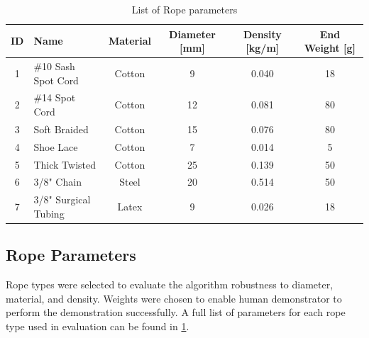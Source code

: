 \documentclass[conference]{IEEEtran}
\begin{document}
\begin{table}[t]
    \centering
    \caption{List of Rope parameters}
    \label{tab:rope_id}
    \small
    \setlength{\tabcolsep}{6pt}
    \begin{tabular}{c l c c c c}
        \toprule
        \textbf{ID} &
        \textbf{Name} &
        \textbf{Material} &
        \textbf{Diameter [mm]} &
        \textbf{Density [kg/m]} &
        \textbf{End Weight [g]} \\
        \midrule
        1 & \#10 Sash Spot Cord   & Cotton & 9  & 0.040 & 18 \\
        2 & \#14 Spot Cord        & Cotton & 12 & 0.081 & 80 \\
        3 & Soft Braided          & Cotton & 15 & 0.076 & 80 \\
        4 & Shoe Lace             & Cotton & 7  & 0.014 & 5  \\
        5 & Thick Twisted         & Cotton & 25 & 0.139 & 50 \\
        6 & 3/8" Chain            & Steel  & 20 & 0.514 & 50 \\
        7 & 3/8" Surgical Tubing  & Latex  & 9  & 0.026 & 18 \\
        \bottomrule
    \end{tabular}
    \label{table:params}
\end{table}
\subsection{Rope Parameters}
\label{sec:rope_params}
Rope types were selected to evaluate the algorithm robustness to diameter, material, and density. Weights were chosen to enable human demonstrator to perform the demonstration successfully. A full list of parameters for each rope type used in evaluation can be found in \cref{table:params}. 
\end{document}
